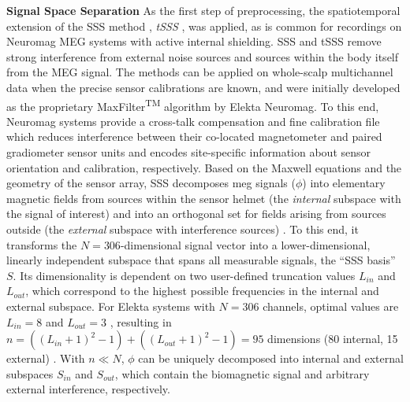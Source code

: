 \textbf{Signal Space Separation} As the first step of preprocessing, the spatiotemporal extension of the \gls{SSS} method \citep{taulu2005presentation}, \textit{\gls{tSSS}} \citep{taulu2006spatiotemporal}, was applied, as is common for recordings on Neuromag MEG systems with active internal shielding.
\gls{SSS} and \gls{tSSS} remove strong interference from external noise sources and sources within the body itself from the MEG signal.
The methods can be applied on whole-scalp multichannel data when the precise sensor calibrations are known, and were initially developed as the proprietary MaxFilter\textsuperscript{TM} algorithm by Elekta Neuromag.
To this end, Neuromag systems provide a cross-talk compensation and fine calibration file which reduces interference between their co-located magnetometer and paired gradiometer sensor units and encodes site-specific information about sensor orientation and calibration, respectively.
Based on the Maxwell equations and the geometry of the sensor array, \gls{SSS} decomposes \gls{meg} signals ($\phi$) into elementary magnetic fields from sources within the sensor helmet (the \textit{internal} subspace with the signal of interest) and into an orthogonal set for fields arising from sources outside (the \textit{external} subspace with interference sources) \citep{taulu2005presentation}.
To this end, it transforms the $N=306$-dimensional signal vector into a lower-dimensional, linearly independent subspace that spans all measurable signals, the ``SSS basis'' $S$.
Its dimensionality is dependent on two user-defined truncation values $L_{in}$ and $L_{out}$, which correspond to the highest possible frequencies in the internal and external subspace.
For Elekta systems with $N=306$ channels, optimal values are $L_{in}=8$ and $L_{out}=3$ \citep{taulu2005sss}, resulting in
$n=((L_{in}+1)^2 -1) + ((L_{out}+1)^2 - 1) = 95$ dimensions (80 internal, 15 external) \citep{taulu2005presentation}.
With $n \ll N$, $\phi$ can be uniquely decomposed into internal and external subspaces $S_{in}$ and $S_{out}$, which contain the biomagnetic signal and arbitrary external interference, respectively.








